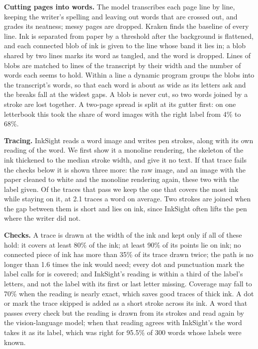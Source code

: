 \documentclass{article}
\begin{document}
\textbf{Cutting pages into words.} The model transcribes each page line by line, keeping the writer's spelling and leaving out words that are crossed out, and grades its neatness; messy pages are dropped. Kraken finds the baseline of every line. Ink is separated from paper by a threshold after the background is flattened, and each connected blob of ink is given to the line whose band it lies in; a blob shared by two lines marks its word as tangled, and the word is dropped. Lines of blobs are matched to lines of the transcript by their width and the number of words each seems to hold. Within a line a dynamic program groups the blobs into the transcript's words, so that each word is about as wide as its letters ask and the breaks fall at the widest gaps. A blob is never cut, so two words joined by a stroke are lost together. A two-page spread is split at its gutter first: on one letterbook this took the share of word images with the right label from 4\% to 68\%.

\textbf{Tracing.} InkSight reads a word image and writes pen strokes, along with its own reading of the word. We first show it a monoline rendering, the skeleton of the ink thickened to the median stroke width, and give it no text. If that trace fails the checks below it is shown three more: the raw image, and an image with the paper cleaned to white and the monoline rendering again, these two with the label given. Of the traces that pass we keep the one that covers the most ink while staying on it, at 2.1 traces a word on average. Two strokes are joined when the gap between them is short and lies on ink, since InkSight often lifts the pen where the writer did not.

\textbf{Checks.} A trace is drawn at the width of the ink and kept only if all of these hold: it covers at least 80\% of the ink; at least 90\% of its points lie on ink; no connected piece of ink has more than 35\% of its trace drawn twice; the path is no longer than 1.6 times the ink would need; every dot and punctuation mark the label calls for is covered; and InkSight's reading is within a third of the label's letters, and not the label with its first or last letter missing. Coverage may fall to 70\% when the reading is nearly exact, which saves good traces of thick ink. A dot or mark the trace skipped is added as a short stroke across its ink. A word that passes every check but the reading is drawn from its strokes and read again by the vision-language model; when that reading agrees with InkSight's the word takes it as its label, which was right for 95.5\% of 300 words whose labels were known.
\end{document}
